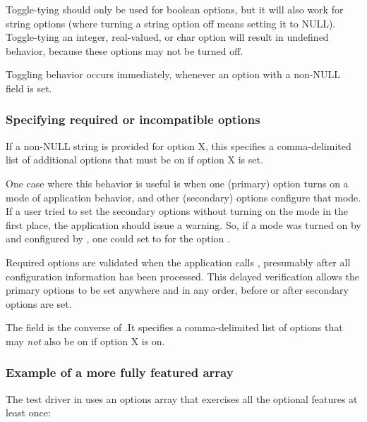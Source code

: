 Toggle-tying should only be used for boolean options, but it will also
work for string options (where turning a string option off means
setting it to NULL). Toggle-tying an integer, real-valued, or char
option will result in undefined behavior, because these options may
not be turned off.

Toggling behavior occurs immediately, whenever an option with a
non-NULL  field is set.



   \subsubsection{Specifying required or incompatible options}

If a non-NULL string  is provided for option X,
this specifies a comma-delimited list of additional options that must
be on if option X is set. 

One case where this behavior is useful is when one (primary) option
turns on a mode of application behavior, and other (secondary) options
configure that mode. If a user tried to set the secondary options
without turning on the mode in the first place, the application should
issue a warning. So, if a mode was turned on by  and
configured by , one could set
 to  for the option
.

Required options are validated when the application calls
, presumably after all configuration
information has been processed. This delayed verification allows the
primary options to be set anywhere and in any order, before or after
secondary options are set.

The  field is the converse of
.It specifies a comma-delimited list of options
that may \emph{not} also be on if option X is on.



   \subsubsection{Example of a more fully featured  array}

The test driver in  uses an options array that
exercises all the optional features at least once:




